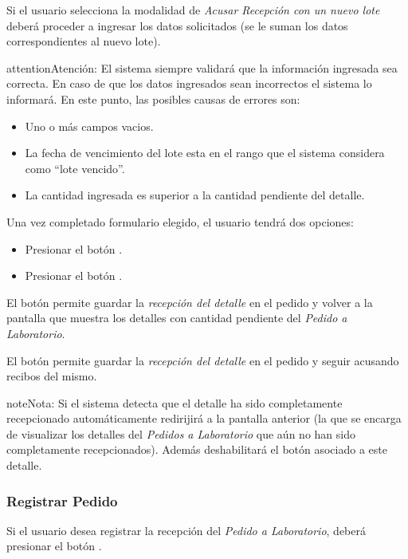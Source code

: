 \documentclass[a4paper,10pt,spanish]{sphinxmanual}
\begin{document}
Si el usuario selecciona la modalidad de \emph{Acusar Recepción con un nuevo lote} deberá proceder a ingresar los datos solicitados (se le suman los datos correspondientes al nuevo lote).

\begin{notice}{attention}{Atención:}
El sistema siempre validará que la información ingresada sea correcta. En caso de que los datos ingresados sean incorrectos el sistema lo informará.
En este punto, las posibles causas de errores son:
\begin{itemize}
\item {} 
Uno o más campos vacios.

\item {} 
La fecha de vencimiento del lote esta en el rango que el sistema considera como ``lote vencido''.

\item {} 
La cantidad ingresada es superior a la cantidad pendiente del detalle.

\end{itemize}
\end{notice}

Una vez completado formulario elegido, el usuario tendrá dos opciones:
\begin{itemize}
\item {} 
Presionar el botón .

\item {} 
Presionar el botón .

\end{itemize}

El botón  permite guardar la \emph{recepción del detalle} en el pedido y volver a la pantalla que muestra los detalles con cantidad pendiente del \emph{Pedido a Laboratorio}.

El botón  permite guardar la \emph{recepción del detalle} en el pedido y seguir acusando recibos del mismo.

\begin{notice}{note}{Nota:}
Si el sistema detecta que el detalle ha sido completamente recepcionado automáticamente redirijirá a la pantalla anterior (la que se encarga de visualizar los detalles del \emph{Pedidos a Laboratorio} que aún no han sido completamente recepcionados). Además deshabilitará el botón  asociado a este detalle.
\end{notice}


\subsubsection{Registrar Pedido}
\label{receppedidosdelab:registrar-pedido-rpl}\label{receppedidosdelab:registrar-pedido}
Si el usuario desea registrar la recepción del \emph{Pedido a Laboratorio}, deberá presionar el botón .
\end{document}

